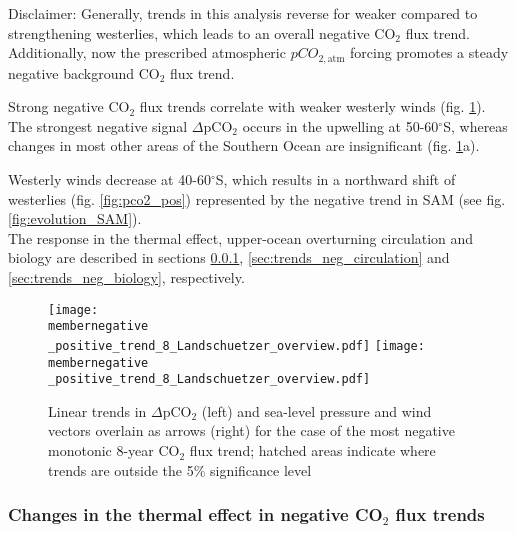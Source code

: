 \documentclass[12pt]{article}
\newcommand{\membernegative}{m143_1995_2002}
\begin{document}
Disclaimer: Generally, trends in this analysis reverse for weaker compared to strengthening westerlies, which leads to an overall negative CO$_2$ flux trend. Additionally, now the prescribed atmospheric $pCO_{2,\text{atm}}$ forcing promotes a steady negative background CO$_2$ flux trend.\newline

Strong negative CO$_2$ flux trends correlate with weaker westerly winds (fig. \ref{fig:pco2_neg}). The strongest negative signal $\Delta$pCO$_2$ occurs in the upwelling at 50-60$^\circ$S, whereas changes in most other areas of the Southern Ocean are insignificant (fig. \ref{fig:pco2_neg}a). 

Westerly winds decrease at 40-60$^\circ$S, which results in a northward shift of westerlies (fig. \ref{fig:pco2_pos}) represented by the negative trend in SAM (see fig. \ref{fig:evolution_SAM}).
\\

The response in the thermal effect, upper-ocean overturning circulation and biology are described in sections \ref{sec:trends_neg_thermal}, \ref{sec:trends_neg_circulation} and \ref{sec:trends_neg_biology}, respectively.


\begin{figure}[h!]
\centering
	\texttt{[image: \\membernegative \_positive\_trend\_8\_Landschuetzer\_overview.pdf]}
	\texttt{[image: \\membernegative \_positive\_trend\_8\_Landschuetzer\_overview.pdf]}	
	\caption{Linear trends in $\Delta$pCO$_2$ (left) and sea-level pressure and wind vectors overlain as arrows (right) for the case of the most negative monotonic 8-year CO$_2$ flux trend; hatched areas indicate where trends are outside the 5\% significance level}
	\label{fig:pco2_neg}
\end{figure}

\clearpage

\subsubsection{Changes in the thermal effect in negative CO$_2$ flux trends}
\label{sec:trends_neg_thermal}
\end{document}
